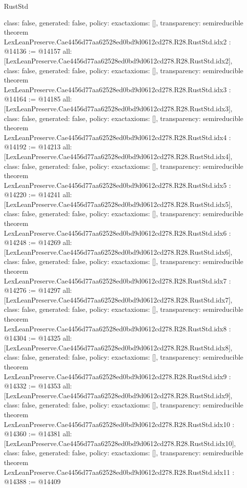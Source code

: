 \begin{lexlean}{RustStd}
\begin{coremodule}
{  class: false,
  generated: false,
  policy: exact{axioms: []},
  transparency: semireducible
}
theorem LexLeanPreserve.Cae4456d77aa62528ed0bd9d0612cd278.R28.RustStd.idx2 : @14136 := @14157 {
  all: [LexLeanPreserve.Cae4456d77aa62528ed0bd9d0612cd278.R28.RustStd.idx2],
  class: false,
  generated: false,
  policy: exact{axioms: []},
  transparency: semireducible
}
theorem LexLeanPreserve.Cae4456d77aa62528ed0bd9d0612cd278.R28.RustStd.idx3 : @14164 := @14185 {
  all: [LexLeanPreserve.Cae4456d77aa62528ed0bd9d0612cd278.R28.RustStd.idx3],
  class: false,
  generated: false,
  policy: exact{axioms: []},
  transparency: semireducible
}
theorem LexLeanPreserve.Cae4456d77aa62528ed0bd9d0612cd278.R28.RustStd.idx4 : @14192 := @14213 {
  all: [LexLeanPreserve.Cae4456d77aa62528ed0bd9d0612cd278.R28.RustStd.idx4],
  class: false,
  generated: false,
  policy: exact{axioms: []},
  transparency: semireducible
}
theorem LexLeanPreserve.Cae4456d77aa62528ed0bd9d0612cd278.R28.RustStd.idx5 : @14220 := @14241 {
  all: [LexLeanPreserve.Cae4456d77aa62528ed0bd9d0612cd278.R28.RustStd.idx5],
  class: false,
  generated: false,
  policy: exact{axioms: []},
  transparency: semireducible
}
theorem LexLeanPreserve.Cae4456d77aa62528ed0bd9d0612cd278.R28.RustStd.idx6 : @14248 := @14269 {
  all: [LexLeanPreserve.Cae4456d77aa62528ed0bd9d0612cd278.R28.RustStd.idx6],
  class: false,
  generated: false,
  policy: exact{axioms: []},
  transparency: semireducible
}
theorem LexLeanPreserve.Cae4456d77aa62528ed0bd9d0612cd278.R28.RustStd.idx7 : @14276 := @14297 {
  all: [LexLeanPreserve.Cae4456d77aa62528ed0bd9d0612cd278.R28.RustStd.idx7],
  class: false,
  generated: false,
  policy: exact{axioms: []},
  transparency: semireducible
}
theorem LexLeanPreserve.Cae4456d77aa62528ed0bd9d0612cd278.R28.RustStd.idx8 : @14304 := @14325 {
  all: [LexLeanPreserve.Cae4456d77aa62528ed0bd9d0612cd278.R28.RustStd.idx8],
  class: false,
  generated: false,
  policy: exact{axioms: []},
  transparency: semireducible
}
theorem LexLeanPreserve.Cae4456d77aa62528ed0bd9d0612cd278.R28.RustStd.idx9 : @14332 := @14353 {
  all: [LexLeanPreserve.Cae4456d77aa62528ed0bd9d0612cd278.R28.RustStd.idx9],
  class: false,
  generated: false,
  policy: exact{axioms: []},
  transparency: semireducible
}
theorem LexLeanPreserve.Cae4456d77aa62528ed0bd9d0612cd278.R28.RustStd.idx10 : @14360 := @14381 {
  all: [LexLeanPreserve.Cae4456d77aa62528ed0bd9d0612cd278.R28.RustStd.idx10],
  class: false,
  generated: false,
  policy: exact{axioms: []},
  transparency: semireducible
}
theorem LexLeanPreserve.Cae4456d77aa62528ed0bd9d0612cd278.R28.RustStd.idx11 : @14388 := @14409 {
}
\end{coremodule}
\end{lexlean}
